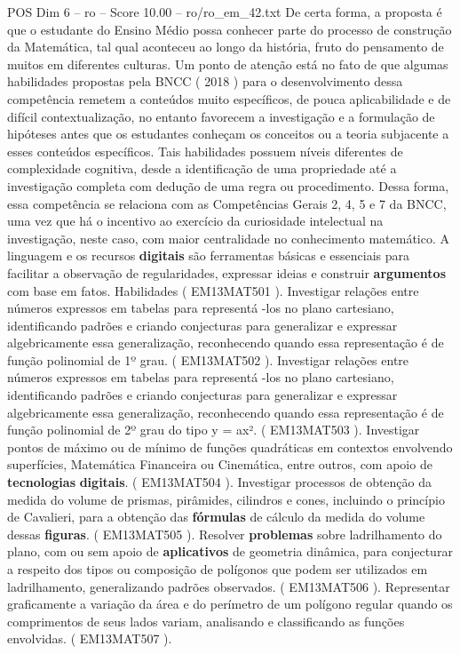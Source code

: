\begin{textsample}{POS Dim 6 – ro – Score 10.00 – ro/ro\_em\_42.txt}
De certa forma, a proposta é que o estudante do Ensino Médio possa conhecer parte do processo de construção da Matemática, tal qual aconteceu ao longo da história, fruto do pensamento de muitos em diferentes culturas.
Um ponto de atenção está no fato de que algumas habilidades propostas pela BNCC ( 2018 ) para o desenvolvimento dessa competência remetem a conteúdos muito específicos, de pouca aplicabilidade e de difícil contextualização, no entanto favorecem a investigação e a formulação de hipóteses antes que os estudantes conheçam os conceitos ou a teoria subjacente a esses conteúdos específicos.
Tais habilidades possuem níveis diferentes de complexidade cognitiva, desde a identificação de uma propriedade até a investigação completa com dedução de uma regra ou procedimento.
Dessa forma, essa competência se relaciona com as Competências Gerais 2, 4, 5 e 7 da BNCC, uma vez que há o incentivo ao exercício da curiosidade intelectual na investigação, neste caso, com maior centralidade no conhecimento matemático.
A linguagem e os recursos \textbf{digitais} são ferramentas básicas e essenciais para facilitar a observação de regularidades, expressar ideias e construir \textbf{argumentos} com base em fatos.
Habilidades ( EM13MAT501 ).
Investigar relações entre números expressos em tabelas para representá -los no plano cartesiano, identificando padrões e criando conjecturas para generalizar e expressar algebricamente essa generalização, reconhecendo quando essa representação é de função polinomial de 1º grau. ( EM13MAT502 ).
Investigar relações entre números expressos em tabelas para representá -los no plano cartesiano, identificando padrões e criando conjecturas para generalizar e expressar algebricamente essa generalização, reconhecendo quando essa representação é de função polinomial de 2º grau do tipo y = ax². ( EM13MAT503 ).
Investigar pontos de máximo ou de mínimo de funções quadráticas em contextos envolvendo superfícies, Matemática Financeira ou Cinemática, entre outros, com apoio de \textbf{tecnologias} \textbf{digitais}. ( EM13MAT504 ).
Investigar processos de obtenção da medida do volume de prismas, pirâmides, cilindros e cones, incluindo o princípio de Cavalieri, para a obtenção das \textbf{fórmulas} de cálculo da medida do volume dessas \textbf{figuras}. ( EM13MAT505 ).
Resolver \textbf{problemas} sobre ladrilhamento do plano, com ou sem apoio de \textbf{aplicativos} de geometria dinâmica, para conjecturar a respeito dos tipos ou composição de polígonos que podem ser utilizados em ladrilhamento, generalizando padrões observados. ( EM13MAT506 ).
Representar graficamente a variação da área e do perímetro de um polígono regular quando os comprimentos de seus lados variam, analisando e classificando as funções envolvidas. ( EM13MAT507 ).

\end{textsample}

